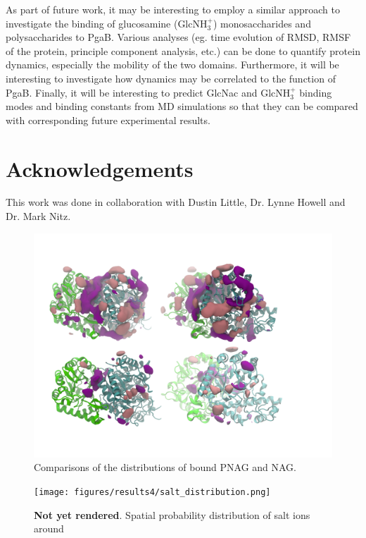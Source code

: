 As part of future work, it may be interesting to employ a similar approach to investigate the binding of glucosamine (GlcNH$_3^+$) monosaccharides and polysaccharides to PgaB.  Various analyses (eg. time evolution of RMSD, RMSF of the protein, principle component analysis, etc.) can be done to quantify protein dynamics, especially the mobility of the two domains. Furthermore, it will be interesting to investigate how dynamics may be correlated to the function of PgaB.  Finally, it will be interesting to predict GlcNac and GlcNH$_3^+$ binding modes and binding constants from MD simulations so that they can be compared with corresponding future experimental results.

\section{Acknowledgements}
This work was done in collaboration with Dustin Little, Dr. Lynne Howell and Dr. Mark Nitz.

\begin{figure}[htbp]
\centering
\includegraphics[width=7in]{figures/results4/pnag_nag_sdf_zoomedout.png}
\caption{Comparisons of the distributions of bound PNAG and NAG.}
\label{fig:pnag_nag_overlapped_zoomedout}
\end{figure}

\begin{figure}[htbp]
\centering
\texttt{[image: figures/results4/salt\_distribution.png]}
\caption[Ionic distribution]{\textbf{Not yet rendered}. Spatial probability distribution of salt ions around \pgab}
\label{fig:salt_density_distribution}
\end{figure}

